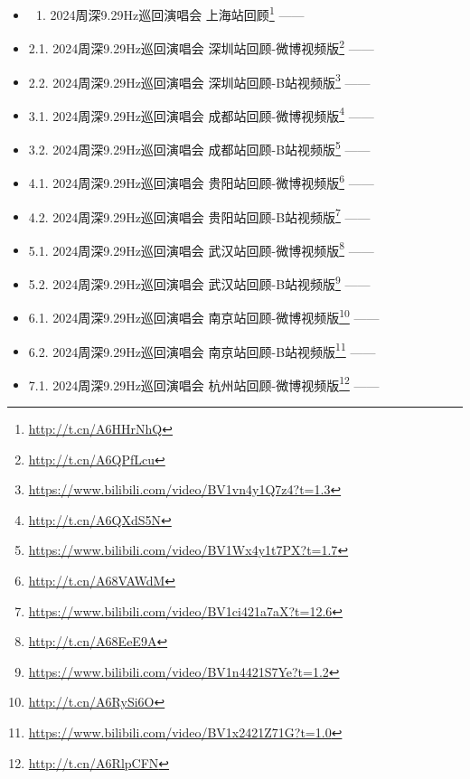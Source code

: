 \documentclass[]{ctexbook}
\providecommand{\tightlist}{%
  \setlength{\itemsep}{0pt}\setlength{\parskip}{0pt}}
\renewcommand{\href}[2]{#2\footnote{\url{#1}}}
\begin{document}
\begin{itemize}
\item
  \begin{enumerate}
  \def\labelenumi{\arabic{enumi}.}
  \tightlist
  \item
    \href{http://t.cn/A6HHrNhQ}{2024周深9.29Hz巡回演唱会 上海站回顾} ------ \citet{weibo-charlie-studio}
  \end{enumerate}
\item
  2.1. \href{http://t.cn/A6QPfLcu}{2024周深9.29Hz巡回演唱会 深圳站回顾-微博视频版} ------ \citet{weibo-charlie-studio}\\
\item
  2.2. \href{https://www.bilibili.com/video/BV1vn4y1Q7z4?t=1.3}{2024周深9.29Hz巡回演唱会 深圳站回顾-B站视频版} ------ \citet{bili-charlie-studio}
\item
  3.1. \href{http://t.cn/A6QXdS5N}{2024周深9.29Hz巡回演唱会 成都站回顾-微博视频版} ------ \citet{weibo-charlie-studio}\\
\item
  3.2. \href{https://www.bilibili.com/video/BV1Wx4y1t7PX?t=1.7}{2024周深9.29Hz巡回演唱会 成都站回顾-B站视频版} ------ \citet{bili-charlie-studio}
\item
  4.1. \href{http://t.cn/A68VAWdM}{2024周深9.29Hz巡回演唱会 贵阳站回顾-微博视频版} ------ \citet{weibo-charlie-studio}\\
\item
  4.2. \href{https://www.bilibili.com/video/BV1ci421a7aX?t=12.6}{2024周深9.29Hz巡回演唱会 贵阳站回顾-B站视频版} ------ \citet{bili-charlie-studio}
\item
  5.1. \href{http://t.cn/A68EeE9A}{2024周深9.29Hz巡回演唱会 武汉站回顾-微博视频版} ------ \citet{weibo-charlie-studio}\\
\item
  5.2. \href{https://www.bilibili.com/video/BV1n4421S7Ye?t=1.2}{2024周深9.29Hz巡回演唱会 武汉站回顾-B站视频版} ------ \citet{bili-charlie-studio}
\item
  6.1. \href{http://t.cn/A6RySi6O}{2024周深9.29Hz巡回演唱会 南京站回顾-微博视频版} ------ \citet{weibo-charlie-studio}\\
\item
  6.2. \href{https://www.bilibili.com/video/BV1x2421Z71G?t=1.0}{2024周深9.29Hz巡回演唱会 南京站回顾-B站视频版} ------ \citet{bili-charlie-studio}
\item
  7.1. \href{http://t.cn/A6RlpCFN}{2024周深9.29Hz巡回演唱会 杭州站回顾-微博视频版} ------ \citet{weibo-charlie-studio}\\

\end{itemize}
\end{document}
